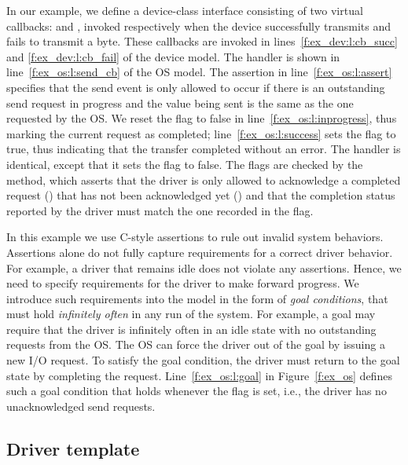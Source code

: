 
In our example, we define a device-class interface consisting of two virtual callbacks:  and , invoked respectively when the device successfully transmits and fails to transmit a byte.  These callbacks are invoked in lines~\ref{f:ex_dev:l:cb_succ} and \ref{f:ex_dev:l:cb_fail} of the device model.  The  handler is shown in line~\ref{f:ex_os:l:send_cb} of the OS model.  The assertion in line~\ref{f:ex_os:l:assert} specifies that the send event is only allowed to occur if there is an outstanding send request in progress and the value being sent is the same as the one requested by the OS.  We reset the  flag to false in line~\ref{f:ex_os:l:inprogress}, thus marking the current request as completed; line~\ref{f:ex_os:l:success} sets the  flag to true, thus indicating that the transfer completed without an error.  The  handler is identical, except that it sets the  flag to false.  The flags are checked by the  method, which asserts that the driver is only allowed to acknowledge a completed request () that has not been acknowledged yet () and that the completion status reported by the driver must match the one recorded in the  flag.

In this example we use C-style assertions to rule out invalid system behaviors.  Assertions alone do not fully capture requirements for a correct driver behavior.  For example, a driver that remains idle does not violate any assertions.  Hence, we need to specify requirements for the driver to make forward progress.  We introduce such requirements into the model in the form of \emph{goal conditions}, that must hold \emph{infinitely often} in any run of the system.  For example, a goal may require that the driver is infinitely often in an idle state with no outstanding requests from the OS.  The OS can force the driver out of the goal by issuing a new I/O request.  To satisfy the goal condition, the driver must return to the goal state by completing the request.  Line~\ref{f:ex_os:l:goal} in Figure~\ref{f:ex_os} defines such a goal condition that holds whenever the  flag is set, i.e., the driver has no unacknowledged send requests.

\subsection{Driver template}

